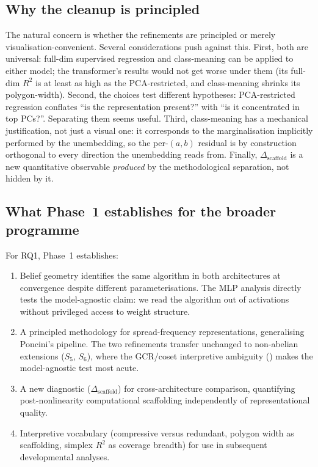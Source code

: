 \documentclass[11pt,a4paper]{article}
\begin{document}
\subsection{Why the cleanup is principled}\label{sec:principled}

The natural concern is whether the refinements are principled or merely visualisation-convenient. Several considerations push against this. First, both are universal: full-dim supervised regression and class-meaning can be applied to either model; the transformer's results would not get worse under them (its full-dim $R^2$ is at least as high as the PCA-restricted, and class-meaning shrinks its polygon-width). Second, the choices test different hypotheses: PCA-restricted regression conflates ``is the representation present?'' with ``is it concentrated in top PCs?''. Separating them seems useful. Third, class-meaning has a mechanical justification, not just a visual one: it corresponds to the marginalisation implicitly performed by the unembedding, so the per-$(a,b)$ residual is by construction orthogonal to every direction the unembedding reads from. Finally, $\Delta_{\mathrm{scaffold}}$ is a new quantitative observable \emph{produced} by the methodological separation, not hidden by it.

\subsection{What Phase~1 establishes for the broader programme}

For RQ1, Phase~1 establishes:
\begin{enumerate}
    \item Belief geometry identifies the same algorithm in both architectures at convergence despite different parameterisations. The MLP analysis directly tests the model-agnostic claim: we read the algorithm out of activations without privileged access to weight structure.
    \item A principled methodology for spread-frequency representations, generalising Poncini's pipeline. The two refinements transfer unchanged to non-abelian extensions ($S_5$, $S_6$), where the GCR/coset interpretive ambiguity (\citealp{chughtai2023toy, stander2024grokking, wu2024unified}) makes the model-agnostic test most acute.
    \item A new diagnostic ($\Delta_{\mathrm{scaffold}}$) for cross-architecture comparison, quantifying post-nonlinearity computational scaffolding independently of representational quality.
    \item Interpretive vocabulary (compressive versus redundant, polygon width as scaffolding, simplex $R^2$ as coverage breadth) for use in subsequent developmental analyses.
\end{enumerate}
\end{document}
